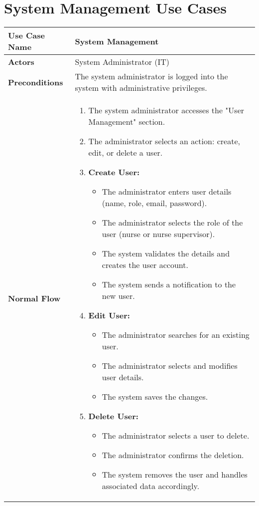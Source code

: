 \documentclass{article}
\begin{document}
\section{System Management Use Cases}
\begin{longtable}{|p{4cm}|p{10cm}|}
    \hline
    \textbf{Use Case Name} & System Management \\
    \hline
    \textbf{Actors} & System Administrator (IT) \\
    \hline
    \textbf{Preconditions} & The system administrator is logged into the system with administrative privileges. \\
    \hline
    \textbf{Normal Flow} & \begin{enumerate}
        \item The system administrator accesses the "User Management" section.
        \item The administrator selects an action: create, edit, or delete a user.
        \item \textbf{Create User:} \begin{itemize}
            \item The administrator enters user details (name, role, email, password).
            \item The administrator selects the role of the user (nurse or nurse supervisor).
            \item The system validates the details and creates the user account.
            \item The system sends a notification to the new user.
        \end{itemize}
        \item \textbf{Edit User:} \begin{itemize}
            \item The administrator searches for an existing user.
            \item The administrator selects and modifies user details.
            \item The system saves the changes.
        \end{itemize}
        \item \textbf{Delete User:} \begin{itemize}
            \item The administrator selects a user to delete.
            \item The administrator confirms the deletion.
            \item The system removes the user and handles associated data accordingly.

\end{itemize}
\end{enumerate}
\end{longtable}
\end{document}
